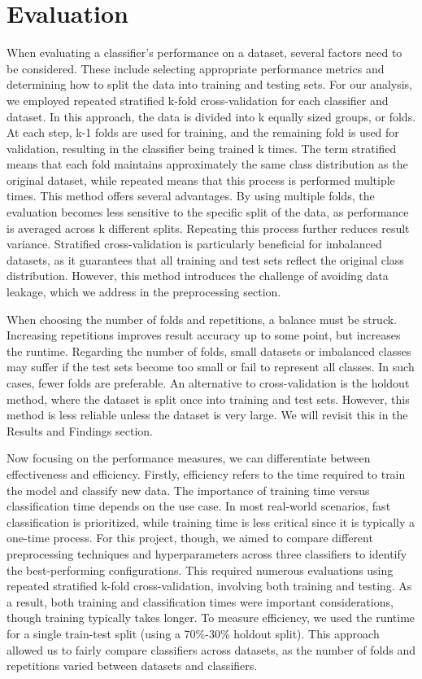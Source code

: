 \documentclass[a4paper,10pt]{article}
\begin{document}
\section{Evaluation}

When evaluating a classifier's performance on a dataset, several factors need to be considered. These include selecting appropriate performance metrics and determining how to split the data into training and testing sets. For our analysis, we employed repeated stratified k-fold cross-validation for each classifier and dataset. In this approach, the data is divided into k equally sized groups, or folds. At each step, k-1 folds are used for training, and the remaining fold is used for validation, resulting in the classifier being trained k times. The term stratified means that each fold maintains approximately the same class distribution as the original dataset, while repeated means that this process is performed multiple times. This method offers several advantages. By using multiple folds, the evaluation becomes less sensitive to the specific split of the data, as performance is averaged across k different splits. Repeating this process further reduces result variance. Stratified cross-validation is particularly beneficial for imbalanced datasets, as it guarantees that all training and test sets reflect the original class distribution. However, this method introduces the challenge of avoiding data leakage, which we address in the preprocessing section.

When choosing the number of folds and repetitions, a balance must be struck. Increasing repetitions improves result accuracy up to some point, but increases the runtime. Regarding the number of folds, small datasets or imbalanced classes may suffer if the test sets become too small or fail to represent all classes. In such cases, fewer folds are preferable. An alternative to cross-validation is the holdout method, where the dataset is split once into training and test sets. However, this method is less reliable unless the dataset is very large. We will revisit this in the Results and Findings section.

Now focusing on the performance measures, we can differentiate between effectiveness and efficiency. Firstly, efficiency refers to the time required to train the model and classify new data. The importance of training time versus classification time depends on the use case. In most real-world scenarios, fast classification is prioritized, while training time is less critical since it is typically a one-time process.
For this project, though, we aimed to compare different preprocessing techniques and hyperparameters across three classifiers to identify the best-performing configurations. This required numerous evaluations using repeated stratified k-fold cross-validation, involving both training and testing. As a result, both training and classification times were important considerations, though training typically takes longer. To measure efficiency, we used the runtime for a single train-test split (using a 70\%-30\% holdout split). This approach allowed us to fairly compare classifiers across datasets, as the number of folds and repetitions varied between datasets and classifiers.
\end{document}
